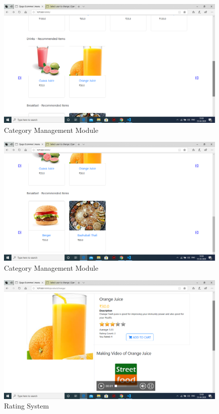 \documentclass[12pt,a4paper]{report}
\begin{document}
\begin{appendices}
\begin{figure}[h!]
	\centering
	\includegraphics[scale=0.3]{3}
	\caption{Category Management Module}
	\label{Architecture}
\end{figure}

\begin{figure}[h!]
	\centering
	\includegraphics[scale=0.3]{4}
	\caption{Category Management Module}
	\label{Architecture}
\end{figure}

\begin{figure}[h!]
	\centering
	\includegraphics[scale=0.3]{5}
	\caption{Rating System}
	\label{Architecture}
\end{figure}


\end{appendices}
\end{document}
